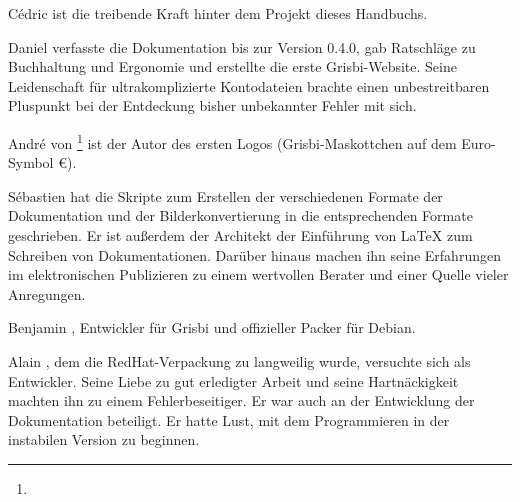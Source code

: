 Cédric  ist die treibende Kraft hinter dem Projekt dieses Handbuchs.

Daniel  verfasste die Dokumentation bis zur Version 0.4.0, gab Ratschläge zu Buchhaltung und Ergonomie und erstellte die erste Grisbi-Website. Seine Leidenschaft für ultrakomplizierte Kontodateien brachte einen unbestreitbaren Pluspunkt bei der Entdeckung bisher unbekannter Fehler mit sich.

André  von \footnote{\urlLinuxGraphic{}} ist der Autor des ersten Logos (Grisbi-Maskottchen auf dem Euro-Symbol €).

Sébastien  hat die Skripte zum Erstellen der verschiedenen Formate der Dokumentation und der Bilderkonvertierung in die entsprechenden Formate geschrieben. Er ist außerdem der Architekt der Einführung von \gls{LaTeX} zum Schreiben von Dokumentationen. Darüber hinaus machen ihn seine Erfahrungen im elektronischen Publizieren zu einem wertvollen Berater und einer Quelle vieler Anregungen.

Benjamin , Entwickler für Grisbi und offizieller Packer für \gls{Debian}.

Alain , dem die \gls{RedHat}-Verpackung zu langweilig wurde, versuchte sich als Entwickler. Seine Liebe zu gut erledigter Arbeit und seine Hartnäckigkeit machten ihn zu einem Fehlerbeseitiger. Er war auch an der Entwicklung der Dokumentation beteiligt. Er hatte Lust, mit dem Programmieren in der instabilen Version zu beginnen.

